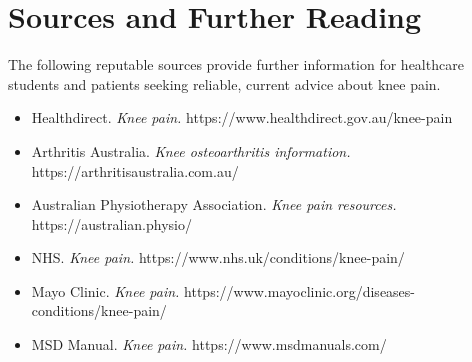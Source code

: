 \section*{Sources and Further Reading}
The following reputable sources provide further information for healthcare students and patients seeking reliable, current advice about knee pain.
\begin{itemize}
    \item Healthdirect. \textit{Knee pain.} https://www.healthdirect.gov.au/knee-pain
    \item Arthritis Australia. \textit{Knee osteoarthritis information.} https://arthritisaustralia.com.au/
    \item Australian Physiotherapy Association. \textit{Knee pain resources.} https://australian.physio/
    \item NHS. \textit{Knee pain.} https://www.nhs.uk/conditions/knee-pain/
    \item Mayo Clinic. \textit{Knee pain.} https://www.mayoclinic.org/diseases-conditions/knee-pain/
    \item MSD Manual. \textit{Knee pain.} https://www.msdmanuals.com/
\end{itemize}
